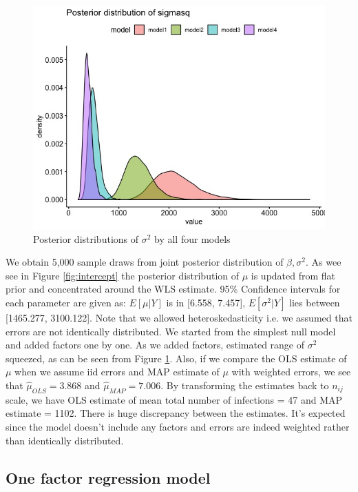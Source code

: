 \documentclass[11pt,twocolumn]{asaproc}
\begin{document}
\begin{figure}[t]
\centering\includegraphics[scale=.30]{sigmasq.jpeg}
\caption{Posterior distributions of $\sigma^2$ by all four models}
\label{fig:sigmas}
\end{figure}

We obtain 5,000 sample draws from joint posterior distribution of $\beta, \sigma^2$. As wee see in Figure \ref{fig:intercept} the posterior distribution of $\mu$ is updated from flat prior and concentrated around the WLS estimate. 95\% Confidence intervals for each parameter are given as: $E[\mu | Y]$ is in [6.558, 7.457], $E[\sigma^2 | Y]$ lies between [1465.277, 3100.122]. Note that we allowed heteroskedasticity i.e. we assumed that errors are not identically distributed. We started from the simplest null model and added factors one by one. As we added factors, estimated range of $\sigma^2$ squeezed, as can be seen from Figure \ref{fig:sigmas}. Also, if we compare the OLS estimate of $\mu$ when we assume iid errors and MAP estimate of $\mu$ with weighted errors, we see that $\hat{\mu}_{OLS} = 3.868$ and $\hat{\mu}_{MAP} = 7.006$. By transforming the estimates back to $n_{ij}$ scale, we have OLS estimate of mean total number of infections = 47 and MAP estimate = 1102. There is huge discrepancy between the estimates. It's expected since the model doesn't include any factors and errors are indeed weighted rather than identically distributed. 




\subsection{One factor regression model}
\end{document}
